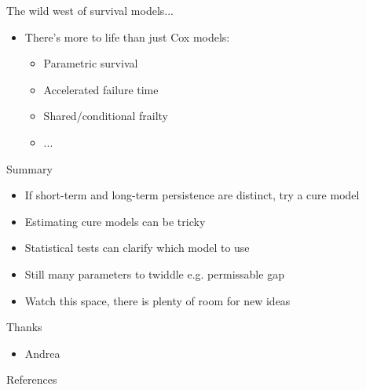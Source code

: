 \documentclass[aspectratio=169,12pt]{beamer} %
\begin{document}
\begin{frame}{The wild west of survival models...}
	\begin{itemize}
		\item There's more to life than just Cox models:
			\begin{itemize}
				\item Parametric survival
				\item Accelerated failure time
				\item Shared/conditional frailty
				\item ...
			\end{itemize}
	\end{itemize}
\end{frame}

\begin{frame}{Summary}
	\begin{itemize}
		\item If short-term and long-term persistence are distinct, try a cure model
		\item Estimating cure models can be tricky
		\item Statistical tests can clarify which model to use
		\item Still many parameters to twiddle e.g. permissable gap
		\item Watch this space, there is plenty of room for new ideas
	\end{itemize}
\end{frame}

\begin{frame}{Thanks}
    \begin{itemize}
        \item Andrea
    \end{itemize}
\end{frame}

\begin{frame}{References}
%        
%        
        \tiny
        
\end{frame}
\end{document}
